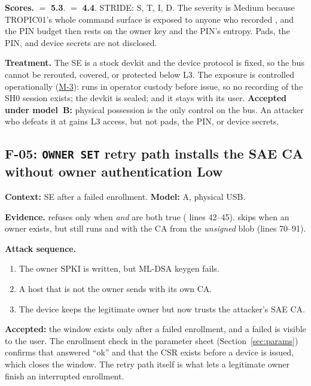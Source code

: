 \documentclass[11pt,a4paper]{article}
\newcommand{\sev}[1]{\textbf{#1}}
\begin{document}
\textbf{Scores.}  $=$ \textbf{5.3}.  $=$ \textbf{4.4}. STRIDE: S, T, I, D. The severity is Medium because TROPIC01's whole command surface is exposed to anyone who recorded , and the PIN budget then rests on the owner key and the PIN's entropy. Pads, the PIN, and device secrets are not disclosed.

\textbf{Treatment.} The SE is a stock devkit and the device protocol is fixed, so the bus cannot be rerouted, covered, or protected below L3. The exposure is controlled operationally (\hyperref[m:M-3]{M-3}):  runs in operator custody before issue, so no recording of the SH0 session exists; the devkit is sealed; and it stays with its user. \textbf{Accepted under model~B:} physical possession is the only control on the bus. An attacker who defeats it at  gains L3 access, but not pads, the PIN, or device secrets.

\subsection*{F-05: \texttt{OWNER SET} retry path installs the SAE CA without owner authentication \hfill \sev{Low}}\label{f:F-05}
\textbf{Context:} SE after a failed enrollment. \textbf{Model:} A, physical USB.

\textbf{Evidence.}  refuses only when  \emph{and}  are both true ( lines 42--45).  skips  when an owner exists, but still runs  and  with the CA from the \emph{unsigned} blob (lines 70--91).

\textbf{Attack sequence.}
\begin{enumerate}
\item The owner SPKI is written, but ML-DSA keygen fails.
\item A host that is not the owner sends  with its own CA.
\item The device keeps the legitimate owner but now trusts the attacker's SAE CA.
\end{enumerate}
\textbf{Accepted:} the window exists only after a failed enrollment, and a failed  is visible to the user. The enrollment check in the parameter sheet (Section~\ref{sec:params}) confirms that  answered ``ok'' and that the CSR exists before a device is issued, which closes the window. The retry path itself is what lets a legitimate owner finish an interrupted enrollment.
\end{document}
